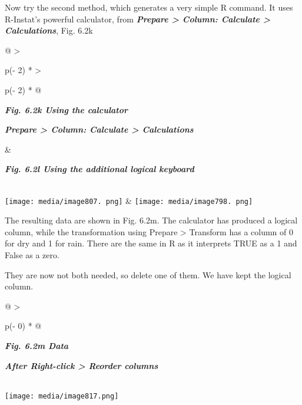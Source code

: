 \documentclass[
  letterpaper,
  DIV=11,
  numbers=noendperiod]{scrreprt}
\begin{document}
Now try the second method, which generates a very simple R command. It
uses R-Instat's powerful calculator, from \textbf{\emph{Prepare
\textgreater{} Column: Calculate \textgreater{} Calculations}}, Fig.
6.2k

\begin{longtable}[]{@{}
  >{\raggedright\arraybackslash}p{(\columnwidth - 2\tabcolsep) * }
  >{\raggedright\arraybackslash}p{(\columnwidth - 2\tabcolsep) * }@{}}
\toprule\noalign{}
\begin{minipage}[b]{\linewidth}\raggedright
\textbf{\emph{Fig. 6.2k Using the calculator}}

\textbf{\emph{Prepare \textgreater{} Column: Calculate \textgreater{}
Calculations}}
\end{minipage} & \begin{minipage}[b]{\linewidth}\raggedright
\textbf{\emph{Fig. 6.2l Using the additional logical keyboard}}
\end{minipage} \\
\midrule\noalign{}
\endhead
\bottomrule\noalign{}
\endlastfoot
\texttt{[image: media/image807. png]}
&
\texttt{[image: media/image798. png]} \\
\end{longtable}

The resulting data are shown in Fig. 6.2m. The calculator has produced a
logical column, while the transformation using Prepare \textgreater{}
Transform has a column of 0 for dry and 1 for rain. There are the same
in R as it interprets TRUE as a 1 and False as a zero.

They are now not both needed, so delete one of them. We have kept the
logical column.

\begin{longtable}[]{@{}
  >{\raggedright\arraybackslash}p{(\columnwidth - 0\tabcolsep) * }@{}}
\toprule\noalign{}
\begin{minipage}[b]{\linewidth}\raggedright
\textbf{\emph{Fig. 6.2m Data}}

\textbf{\emph{After Right-click \textgreater{} Reorder columns}}
\end{minipage} \\
\midrule\noalign{}
\endhead
\bottomrule\noalign{}
\endlastfoot
\texttt{[image: media/image817.png]} \\
\end{longtable}
\end{document}
